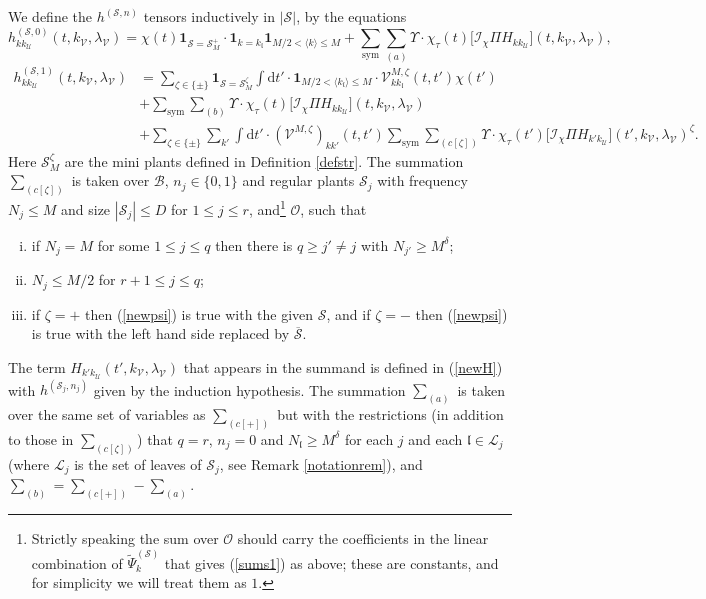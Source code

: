 \documentclass[11 pt,reqno]{amsart}
\theoremstyle{definition}
\theoremstyle{remark}
\numberwithin{equation}{section}
\newcommand{\Sc}{\mathcal{S}}
\newcommand{\Lc}{\mathcal{L}}
\newcommand{\Ic}{\mathcal{I}}
\newcommand{\Uc}{\mathcal{U}}
\newcommand{\Vc}{\mathcal{V}}
\newcommand{\lf}{\mathfrak{l}}
\newcommand{\Bs}{\mathscr{B}}
\newcommand{\Os}{\mathscr{O}}
\newcommand{\Vs}{\mathscr{V}}
\begin{document}
{We define the $h^{(\Sc,n)}$ tensors inductively in $|\Sc|$, by the equations
\begin{equation}\label{deftensor1}h_{kk_\Uc}^{(\Sc,0)}(t,k_\Vc,\lambda_\Vc)=\chi(t)\mathbf{1}_{\Sc=\Sc_M^+}\cdot\mathbf{1}_{k=k_\lf}\mathbf{1}_{M/2<\langle k\rangle\leq M}+\sum_{\mathrm{sym}}\sum_{(a)}\Upsilon\cdot\chi_\tau(t)\big[\Ic_\chi\Pi H_{kk_\Uc}\big](t,k_\Vc,\lambda_\Vc),
\begin{aligned}
\end{aligned}
\end{equation}
\begin{equation}\label{deftensor2}\begin{aligned}h_{kk_\Uc}^{(\Sc,1)}(t,k_\Vc,\lambda_\Vc)&=\sum_{\zeta\in\{\pm\}}\mathbf{1}_{\Sc=\Sc_M^\zeta}\int\mathrm{d}t'\cdot\mathbf{1}_{M/2<\langle k_\lf\rangle\leq M}\cdot\Vs_{kk_\lf}^{M,\zeta}(t,t')\chi(t')\\
&+\sum_{\mathrm{sym}}\sum_{(b)}\Upsilon\cdot\chi_\tau(t)\big[\Ic_\chi\Pi H_{kk_\Uc}\big](t,k_\Vc,\lambda_\Vc)\\
&+\sum_{\zeta\in\{\pm\}}\sum_{k'}\int\mathrm{d}t'\cdot (\Vs^{M,\zeta})_{kk'}(t,t')\sum_{\mathrm{sym}}\sum_{(c[\zeta])}\Upsilon\cdot\chi_\tau(t')\big[\Ic_\chi\Pi H_{k'k_\Uc}\big](t',k_\Vc,\lambda_\Vc)^\zeta.
\end{aligned}
\end{equation} 
Here $\Sc_M^\zeta$ are the mini plants defined in Definition \ref{defstr}. The summation $\sum_{(c[\zeta])}$ is taken over $\Bs$, $n_j\in\{0,1\}$ and regular plants $\Sc_j$ with frequency $N_j\leq M$ and size $|\Sc_j|\leq D$ for $1\leq j\leq r$, and\footnote{Strictly speaking the sum over $\Os$ should carry the coefficients in the linear combination of $\widetilde{\Psi}_k^{(\Sc)}$ that gives (\ref{sums1}) as above; these are constants, and for simplicity we will treat them as $1$.} $\Os$, such that
\begin{enumerate}[(i)]
\item if $N_j=M$ for some $1\leq j\leq q$ then there is $q\geq j'\neq j$ with $N_{j'}\geq M^\delta$;
\item $N_j\leq M/2$ for $r+1\leq j\leq q$;
\item if $\zeta=+$ then (\ref{newpsi}) is true with the given $\Sc$, and if $\zeta=-$ then (\ref{newpsi}) is true with the left hand side replaced by $\overline{\Sc}$.
\end{enumerate} The term $H_{k'k_\Uc}(t',k_\Vc,\lambda_\Vc)$ that appears in the summand is defined in (\ref{newH}) with $h^{(\Sc_j,n_j)}$ given by the induction hypothesis. The summation $\sum_{(a)}$ is taken over the same set of variables as $\sum_{(c[+])}$ but with the restrictions (in addition to those in $\sum_{(c[\zeta])}$) that $q=r$, $n_j=0$ and $N_{\lf}\geq M^\delta$ for each $j$ and each $\lf\in\Lc_j$ (where $\Lc_j$ is the set of leaves of $\Sc_j$, see Remark \ref{notationrem}), and $\sum_{(b)}=\sum_{(c[+])}-\sum_{(a)}$.

}
\end{document}
